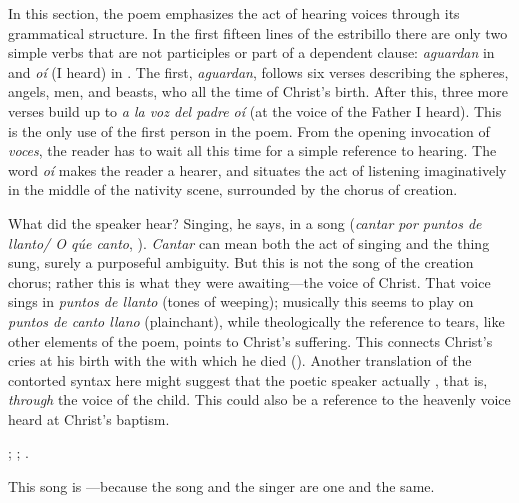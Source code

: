 In this section, the poem emphasizes the act of hearing voices through its
grammatical structure.
In the first fifteen lines of the estribillo there are only two simple verbs
that are not participles or part of a dependent clause: \emph{aguardan} in
 and \emph{oí} (I heard) in .
The first, \emph{aguardan}, follows six verses describing the spheres, angels,
men, and beasts, who all  the time of Christ's birth.
After this, three more verses build up to \emph{a la voz del padre oí} (at the
voice of the Father I heard).
This is the only use of the first person in the poem.
From the opening invocation of \emph{voces}, the reader has to wait all this
time for a simple reference to hearing.
The word \emph{oí} makes the reader a hearer, and situates the act of listening
imaginatively in the middle of the nativity scene, surrounded by the chorus of
creation.

What did the speaker hear? 
Singing, he says, in a song (\emph{cantar por puntos de llanto/ O qúe canto},
).
\emph{Cantar} can mean both the act of singing and the thing sung, surely a
purposeful ambiguity.
But this is not the song of the creation chorus; rather this is what they were
awaiting---the voice of Christ.
That voice sings in \emph{puntos de llanto} (tones of weeping); musically this
seems to play on \emph{puntos de canto llano} (plainchant), while theologically
the reference to tears, like other elements of the poem, points to Christ's
suffering.
This connects Christ's cries at his birth with the  with
which he died ().
Another translation of the contorted syntax here might suggest that the poetic
speaker actually , that is,
\emph{through} the voice of the child.
This could also be a reference to the heavenly voice heard at Christ's baptism.%
\begin{Footnote} 
    ; ; .
\end{Footnote}
This song is ---because
the song and the singer are one and the same.

